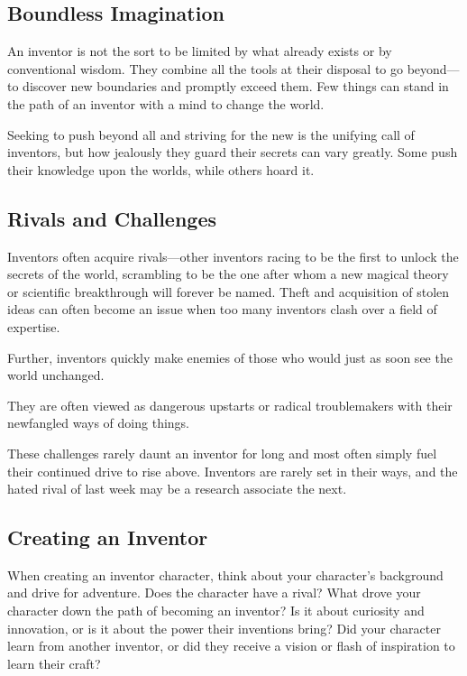 \documentclass[11pt,twoside,openany]{book}  %
\begin{document}
\subsection{Boundless Imagination}

An inventor is not the sort to be limited by what already exists or by conventional wisdom. They combine all the tools at their disposal to go beyond—to discover new boundaries and promptly exceed them. Few things can stand in the path of an inventor with a mind to change the world.

Seeking to push beyond all and striving for the new is the unifying call of inventors, but how jealously they guard their secrets can vary greatly. Some push their knowledge upon the worlds, while others hoard it.

\subsection{Rivals and Challenges}

Inventors often acquire rivals—other inventors racing to be the first to unlock the secrets of the world, scrambling to be the one after whom a new magical theory or scientific breakthrough will forever be named. Theft and acquisition of stolen ideas can often become an issue when too many inventors clash over a field of expertise.

Further, inventors quickly make enemies of those who would just as soon see the world unchanged.

They are often viewed as dangerous upstarts or radical troublemakers with their newfangled ways of doing things.

These challenges rarely daunt an inventor for long and most often simply fuel their continued drive to rise above. Inventors are rarely set in their ways, and the hated rival of last week may be a research associate the next.

\subsection{Creating an Inventor}

When creating an inventor character, think about your character’s background and drive for adventure. Does the character have a rival? What drove your character down the path of becoming an inventor? Is it about curiosity and innovation, or is it about the power their inventions bring? Did your character learn from another inventor, or did they receive a vision or flash of inspiration to learn their craft?
\end{document}
